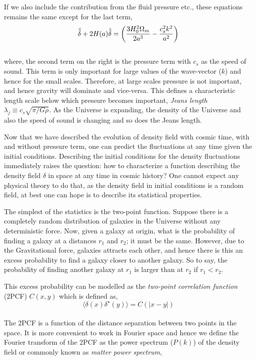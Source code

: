 If we also include the contribution from the fluid pressure etc., these equations remains
the same except for the last term,
\begin{equation}
\centering
	\ddot{\tilde{\delta}} + 2H(a) \dot{\tilde{\delta}} = 
					\left( \dfrac{3H_0^2\Omega_m}{2a^3} - \dfrac{c_s^2k^2}{a^2}   \right)
\end{equation}
\\
where, the second term on the right is the pressure term with $c_s$ as the speed of sound. 
This term is only important
for large values of the wave-vector ($k$) and hence for the small scales. Therefore, at
large scales pressure is not important, and hence gravity will dominate and vice-versa. 
This defines a characteristic length scale below which pressure becomes important, 
{\it Jeans length} $\lambda_j \equiv c_s \sqrt{\pi/G\rho}$. As the Universe is 
expanding, the density of the Universe and also the speed of sound is changing 
and so does the Jeans length.

Now that we have described the evolution of density field with cosmic time, with and
without pressure term, one can predict the fluctuations at any time given the initial
conditions. Describing the initial conditions for the density fluctuations immediately
raises the question: how to characterize a function describing the density field $\delta$
in space at any time in cosmic history? One cannot expect any physical theory to 
do that, as the density field
in initial conditions is a random field, at best one can hope is to describe its
statistical properties. 

The simplest of the statistics is the two-point function. Suppose there is a 
completely random distribution of galaxies in the Universe without any deterministic 
force. Now, given a galaxy at origin, what is the probability of finding a galaxy at a 
distances $r_1$ and $r_2$; it must be the same. 
However, due to the Gravitational force, galaxies attracts each other, and hence 
there is this an excess probability to find a galaxy closer to another galaxy. So to say, 
the probability of finding another galaxy at $r_1$ is larger than
at $r_2$ if $r_1<r_2$.

This excess probability can be modelled as the {\it two-point correlation function} (2PCF) 
$C(x,y)$ which is defined as, 
\begin{equation}
	\langle \delta(x) \delta^{\star}(y) \rangle = C(|x-y|)
\end{equation}
\\
The 2PCF is a function of the distance
separation between two points in the space. It is more convenient to work in 
Fourier space and hence we define the Fourier transform of the 2PCF as the 
power spectrum ($P(k)$) of the density field or commonly known as
{\it matter power spectrum},

